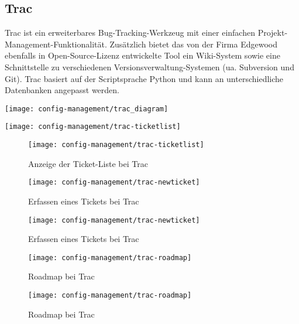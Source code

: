 %
%
\subsection{Trac}
\begin{minipage}{0.55\linewidth}
Trac ist ein erweiterbares Bug-Tracking-Werkzeug mit einer einfachen
Projekt-Management-Funktionalität.
Zusätzlich bietet das von der Firma Edgewood ebenfalls in
Open-Source-Lizenz entwickelte Tool
ein Wiki-System sowie eine Schnittstelle zu verschiedenen Versionsverwaltung-Systemen
(ua. Subversion und Git). Trac basiert auf der Scriptsprache Python und kann
an unterschiedliche Datenbanken angepasst werden.
\end{minipage}
\hfill
\begin{minipage}{0.4\linewidth}
\texttt{[image: config-management/trac\_diagram]}
\end{minipage}
%
\ifslides
\begin{center}
\texttt{[image: config-management/trac-ticketlist]}
\end{center}
\else
\begin{figure}[H]
\texttt{[image: config-management/trac-ticketlist]}
\caption{Anzeige der Ticket-Liste bei Trac}
\end{figure}
\fi
\ifslides
\begin{figure}[H]
\begin{center}
\texttt{[image: config-management/trac-newticket]}
\caption{Erfassen eines Tickets bei Trac}
\end{center}
\end{figure}
\else
\begin{figure}[H]
\begin{center}
\texttt{[image: config-management/trac-newticket]}
\caption{Erfassen eines Tickets bei Trac}
\end{center}
\end{figure}
\fi
%
\ifslides
\begin{figure}[H]
\begin{center}
\texttt{[image: config-management/trac-roadmap]}
\caption{Roadmap bei Trac}
\end{center}
\end{figure}
\else
\begin{figure}[H]
\begin{center}
\texttt{[image: config-management/trac-roadmap]}
\caption{Roadmap bei Trac}
\end{center}
\end{figure}
\fi
